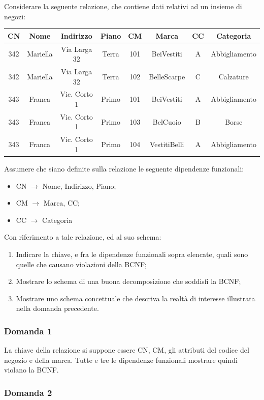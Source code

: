 \documentclass{article}
\begin{document}
Considerare la seguente relazione, che contiene dati relativi ad un insieme di negozi:
\begin{center}
    \begin{tabular}{|c|c|c|c|c|c|c|c|}
        \hline CN&Nome&Indirizzo&Piano&CM&Marca&CC&Categoria\\\hline
        342&Mariella&Via Larga 32&Terra&101&BeiVestiti&A&Abbigliamento\\\hline
        342&Mariella&Via Larga 32&Terra&102&BelleScarpe&C&Calzature\\\hline
        343&Franca&Vic. Corto 1&Primo&101&BeiVestiti&A&Abbigliamento\\\hline
        343&Franca&Vic. Corto 1&Primo&103&BelCuoio&B&Borse\\\hline
        343&Franca&Vic. Corto 1&Primo&104&VestitiBelli&A&Abbigliamento\\\hline
    \end{tabular}
\end{center}
Assumere che siano definite sulla relazione le seguente dipendenze funzionali:
\begin{itemize}
    \item CN $\to$ Nome, Indirizzo, Piano;
    \item CM $\to$ Marca, CC;
    \item CC $\to$ Categoria
\end{itemize}
Con riferimento a tale relazione, ed al suo schema:
\begin{enumerate}
    \item Indicare la chiave, e fra le dipendenze funzionali sopra elencate, quali sono quelle che causano violazioni della BCNF;
    \item Mostrare lo schema di una buona decomposizione che soddisfi la BCNF;
    \item Mostrare uno schema concettuale che descriva la realtà di interesse illustrata nella domanda precedente. 
\end{enumerate}

\subsubsection*{Domanda 1}

La chiave della relazione si suppone essere CN, CM, gli attributi del codice del negozio e della marca. Tutte e tre le dipendenze funzionali mostrare quindi violano la BCNF. 

\subsubsection*{Domanda 2}
\end{document}
